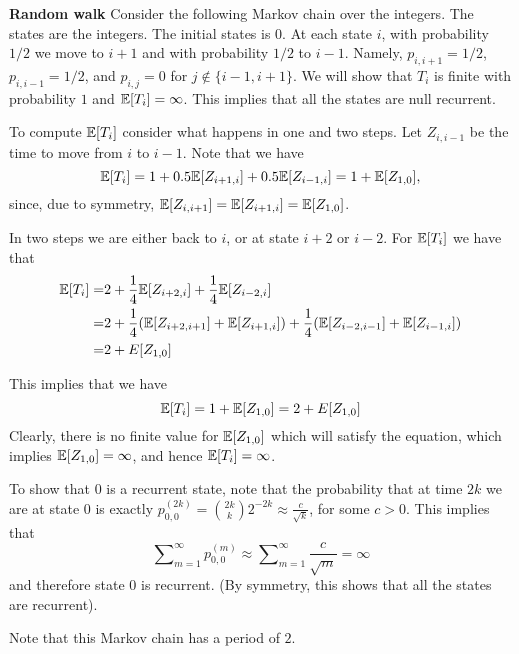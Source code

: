 \begin{example}{\bf Random walk}
Consider the following Markov chain over the integers. The states
are the integers. The initial states is $0$. At each state $i$, with
probability $1/2$ we move to $i+1$ and with probability $1/2$ to
$i-1$. Namely, $p_{i,i+1}=1/2$, $p_{i,i-1}=1/2$, and $p_{i,j} =0$
for $j \not\in \{i-1,i+ 1\}$. We will show that $T_i$ is finite with
probability $1$ and $\mathbb{E}[T_i]=\infty$. This implies that all the
states are null recurrent.

To compute $\mathbb{E}[T_i]$ consider what happens in one and two steps. Let
$Z_{i,i-1}$ be the time to move from $i$ to $i-1$. Note that  we
have \[
\mathbb{E}[T_i]=1+0.5\mathbb{E}[Z_{i+1,i}]+0.5\mathbb{E}[Z_{i-1,i}]=1+\mathbb{E}[Z_{1,0}],
\]
since, due to symmetry, $\mathbb{E}[Z_{i,i+1}]=\mathbb{E}[Z_{i+1,i}]=\mathbb{E}[Z_{1,0}]$.

In two steps we are either back to $i$, or at state $i+2$ or $i-2$.
For $\mathbb{E}[T_i]$ we have that
\begin{align*}
\mathbb{E}[T_i]=&
2+\frac{1}{4}\mathbb{E}[Z_{i+2,i}]+\frac{1}{4}\mathbb{E}[Z_{i-2,i}] \\
=&2+\frac{1}{4} (\mathbb{E}[Z_{i+2,i+1}]+\mathbb{E}[Z_{i+1,i}])+\frac{1}{4}( \mathbb{E}[Z_{i-2,i-1}]+\mathbb{E}[Z_{i-1,i}])\\
 =&2+E[Z_{1,0}]\\
\end{align*}

This implies that we have
\[
\mathbb{E}[T_i]=1+\mathbb{E}[Z_{1,0}]=2+E[Z_{1,0}]
\]
Clearly, there is no finite value for $\mathbb{E}[Z_{1,0}]$ which will
satisfy the equation, which implies $\mathbb{E}[Z_{1,0}]=\infty$, and hence
$\mathbb{E}[T_i]=\infty$.

To show that $0$ is a recurrent state, note that the probability
that at time $2k$ we are at state $0$ is exactly $p_{0,0}^{(2k)}={2k
\choose k}2^{-2k}\approx \frac{c}{\sqrt{k}}$, for some $c>0$. This
implies that
$$
\sum\nolimits_{m = 1}^\infty {p_{0,0}^{(m)}}\approx \sum\nolimits_{m
= 1}^\infty \frac{c}{\sqrt{m}}=\infty
$$
and therefore state $0$ is recurrent. (By symmetry, this shows that
all the states are recurrent).

Note that this Markov chain has a period of $2$.
\end{example}

